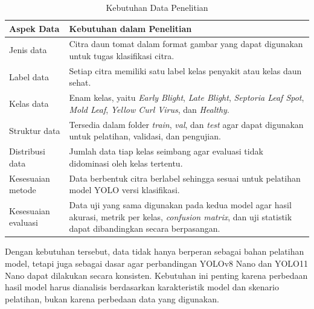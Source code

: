 \begin{sectioncontent}
\begin{subsectioncontent}
        \begin{table}[H]
            \centering
            \caption{Kebutuhan Data Penelitian}
            \label{tab:kebutuhan-data}
            \small
            \renewcommand{\arraystretch}{1.25}
            \begin{tabularx}{\textwidth}{|p{3.8cm}|X|}
                \hline
                \textbf{Aspek Data} & \textbf{Kebutuhan dalam Penelitian} \\
                \hline
                Jenis data & Citra daun tomat dalam format gambar yang dapat digunakan untuk tugas klasifikasi citra. \\
                \hline
                Label data & Setiap citra memiliki satu label kelas penyakit atau kelas daun sehat. \\
                \hline
                Kelas data & Enam kelas, yaitu \textit{Early Blight}, \textit{Late Blight}, \textit{Septoria Leaf Spot}, \textit{Mold Leaf}, \textit{Yellow Curl Virus}, dan \textit{Healthy}. \\
                \hline
                Struktur data & Tersedia dalam folder \textit{train}, \textit{val}, dan \textit{test} agar dapat digunakan untuk pelatihan, validasi, dan pengujian. \\
                \hline
                Distribusi data & Jumlah data tiap kelas seimbang agar evaluasi tidak didominasi oleh kelas tertentu. \\
                \hline
                Kesesuaian metode & Data berbentuk citra berlabel sehingga sesuai untuk pelatihan model YOLO versi klasifikasi. \\
                \hline
                Kesesuaian evaluasi & Data uji yang sama digunakan pada kedua model agar hasil akurasi, metrik per kelas, \textit{confusion matrix}, dan uji statistik dapat dibandingkan secara berpasangan. \\
                \hline
            \end{tabularx}
        \end{table}

        Dengan kebutuhan tersebut, data tidak hanya berperan sebagai bahan pelatihan model, tetapi juga sebagai dasar agar perbandingan YOLOv8 Nano dan YOLO11 Nano dapat dilakukan secara konsisten. Kebutuhan ini penting karena perbedaan hasil model harus dianalisis berdasarkan karakteristik model dan skenario pelatihan, bukan karena perbedaan data yang digunakan.
    \end{subsectioncontent}


\end{sectioncontent}
